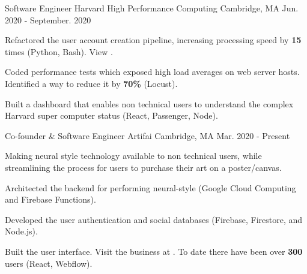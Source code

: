 

\begin{cventries}

  \cventry
    {Software Engineer} %
    {Harvard High Performance Computing} %
    {Cambridge, MA} %
    {Jun. 2020 - September. 2020} %
    {
      \begin{cvitems} %
      \item {Refactored the user account creation pipeline, increasing processing speed by \textbf{15} times (Python, Bash). View .} 
      \item {Coded performance tests which exposed high load averages on web server hosts. Identified a way to reduce it by \textbf{70\%} (Locust).}
      \item {Built a dashboard that enables non technical users to understand the complex Harvard super computer status (React, Passenger, Node).}
      \end{cvitems}
    }

  \cventry
    {Co-founder \& Software Engineer} %
    {Artifai} %
    {Cambridge, MA} %
    {Mar. 2020 - Present} %
    {
      \begin{cvitems} %
      \item {Making neural style technology available to non technical users, while streamlining the process for users to purchase their art on a poster/canvas.}
      \item {Architected the backend for performing neural-style (Google Cloud Computing and Firebase Functions).}
      \item {Developed the user authentication and social databases (Firebase, Firestore, and Node.js).}
      \item {Built the user interface. Visit the business at . To date there have been over \textbf{300} users (React, Webflow).}
      \end{cvitems}
    }


\end{cventries}
